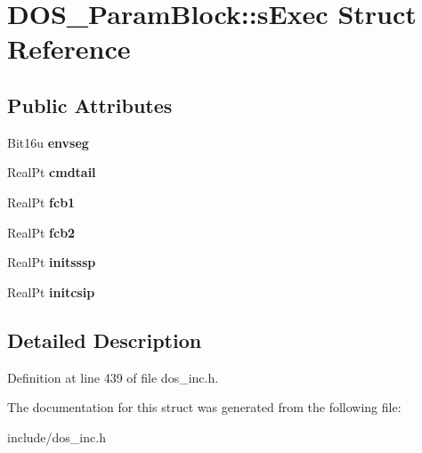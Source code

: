 \hypertarget{structDOS__ParamBlock_1_1sExec}{\section{D\-O\-S\-\_\-\-Param\-Block\-:\-:s\-Exec Struct Reference}
\label{structDOS__ParamBlock_1_1sExec}
}
\subsection*{Public Attributes}
\begin{DoxyCompactItemize}
\item 
\hypertarget{structDOS__ParamBlock_1_1sExec_ab687ac3ee3f86582a88216f428b86770}{Bit16u {\bfseries envseg}}\label{structDOS__ParamBlock_1_1sExec_ab687ac3ee3f86582a88216f428b86770}

\item 
\hypertarget{structDOS__ParamBlock_1_1sExec_ab6b6951382774b8c938f9428192c529d}{Real\-Pt {\bfseries cmdtail}}\label{structDOS__ParamBlock_1_1sExec_ab6b6951382774b8c938f9428192c529d}

\item 
\hypertarget{structDOS__ParamBlock_1_1sExec_a90a2f5095e246afb9c22e59625d47637}{Real\-Pt {\bfseries fcb1}}\label{structDOS__ParamBlock_1_1sExec_a90a2f5095e246afb9c22e59625d47637}

\item 
\hypertarget{structDOS__ParamBlock_1_1sExec_a07ee173102f3e88504b4c76674174243}{Real\-Pt {\bfseries fcb2}}\label{structDOS__ParamBlock_1_1sExec_a07ee173102f3e88504b4c76674174243}

\item 
\hypertarget{structDOS__ParamBlock_1_1sExec_a0541b0ed955144e206155d01815ab077}{Real\-Pt {\bfseries initsssp}}\label{structDOS__ParamBlock_1_1sExec_a0541b0ed955144e206155d01815ab077}

\item 
\hypertarget{structDOS__ParamBlock_1_1sExec_a9fd385a207f3887bc6e26973d2b11e8f}{Real\-Pt {\bfseries initcsip}}\label{structDOS__ParamBlock_1_1sExec_a9fd385a207f3887bc6e26973d2b11e8f}

\end{DoxyCompactItemize}


\subsection{Detailed Description}


Definition at line 439 of file dos\-\_\-inc.\-h.



The documentation for this struct was generated from the following file\-:\begin{DoxyCompactItemize}
\item 
include/dos\-\_\-inc.\-h\end{DoxyCompactItemize}
